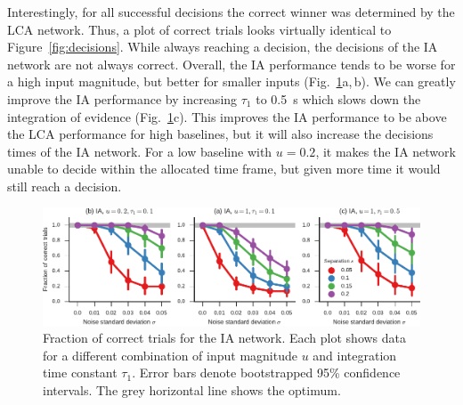 \documentclass[10pt,letterpaper]{article}
\begin{document}
Interestingly, for all successful decisions the correct winner was determined by the LCA network.
Thus, a plot of correct trials looks virtually identical to Figure~\ref{fig:decisions}.
While always reaching a decision, the decisions of the IA network are not always correct.
Overall, the IA performance tends to be worse for a high input magnitude, but better for smaller inputs (Fig.~\ref{fig:correct}a,\,b).
We can greatly improve the IA performance by increasing $\tau_1$ to \SI{0.5}{\second} which slows down the integration of evidence (Fig.~\ref{fig:correct}c).
This improves the IA performance to be above the LCA performance for high baselines, but it will also increase the decisions times of the IA network.
For a low baseline with $u=0.2$, it makes the IA network unable to decide within the allocated time frame, but given more time it would still reach a decision.
\begin{figure}[t]
    \centering
    \includegraphics{figures/correct}
    \caption{
        Fraction of correct trials for the IA network.  
        Each plot shows data for a different combination of input magnitude $u$ and integration time constant $\tau_1$.
        Error bars denote bootstrapped 95\% confidence intervals.
        The grey horizontal line shows the optimum.
    }\label{fig:correct}
\end{figure}
\end{document}

